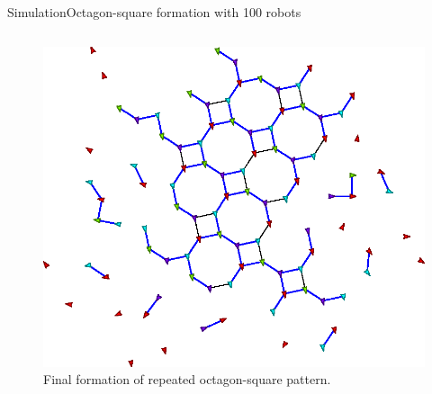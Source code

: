 \documentclass[10pt]{beamer}
\begin{document}
\begin{frame}{Simulation}{Octagon-square formation with 100 robots}
\begin{block}{}
\begin{columns}[T]
\begin{column}{.5\textwidth}
\begin{figure}
          \includegraphics[width=\linewidth]{figs/final-formation}
          \caption{Final formation of repeated octagon-square pattern.}
        \end{figure}
        \begin{center}
        \end{center}
      \end{column}%
    \end{columns}
  \end{block}
\end{frame}
\end{document}
